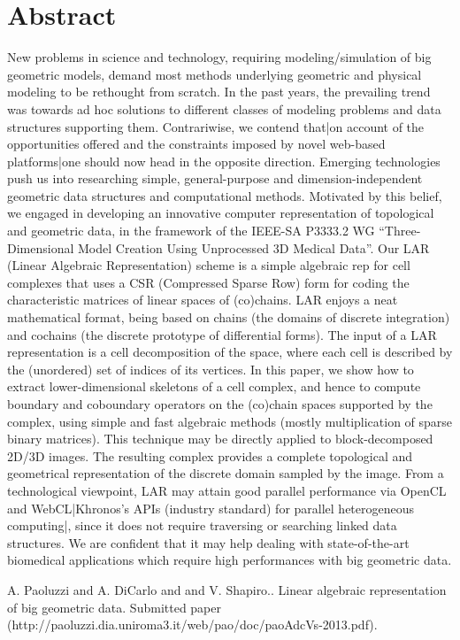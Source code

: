 \documentclass[article, A4, 11pt]{llncs}%
\begin{document}
\section*{Abstract}
New problems in science and technology, requiring modeling/simulation of big geometric models, demand most methods underlying geometric and physical modeling to be rethought from scratch. In the past years, the prevailing trend was towards ad hoc solutions to different classes of modeling problems and data structures supporting them. Contrariwise, we contend that|on account of the opportunities offered and the constraints imposed by novel web-based platforms|one should now head in the opposite direction. Emerging technologies push us into researching simple, general-purpose and dimension-independent geometric data structures and computational methods. Motivated by this belief, we engaged in developing an innovative computer representation of topological and geometric data, in the framework of the IEEE-SA P3333.2 WG ``Three-Dimensional Model Creation Using Unprocessed 3D Medical Data''. Our LAR (Linear Algebraic Representation) scheme is a simple algebraic rep for cell complexes that uses a CSR (Compressed Sparse Row) form for coding the characteristic matrices of linear spaces of (co)chains. LAR enjoys a neat mathematical format, being based on chains (the domains of discrete integration) and cochains (the discrete prototype of differential forms). The input of a LAR representation is a cell decomposition of the space, where each cell is described by the (unordered) set of indices of its vertices. In this paper, we show how to extract lower-dimensional skeletons of a cell complex, and hence to compute boundary and coboundary operators on the (co)chain spaces supported by the complex, using simple and fast algebraic methods (mostly multiplication of sparse binary matrices). This technique may be directly applied to block-decomposed 2D/3D images. The resulting complex provides a complete topological and geometrical representation of the discrete domain sampled by the image. From a technological viewpoint, LAR may attain good parallel performance via OpenCL and WebCL|Khronos's APIs (industry standard) for parallel heterogeneous computing|, since it does not require traversing or searching linked data structures. We are confident that it may help dealing with state-of-the-art biomedical applications which require high performances with big geometric data.


\begin{thebibliography}{10}
{\sc A. Paoluzzi and A. DiCarlo and and V. Shapiro.}. {Linear algebraic representation of big geometric data}. Submitted paper (http://paoluzzi.dia.uniroma3.it/web/pao/doc/paoAdcVs-2013.pdf).
\end{thebibliography} %
\end{document}
